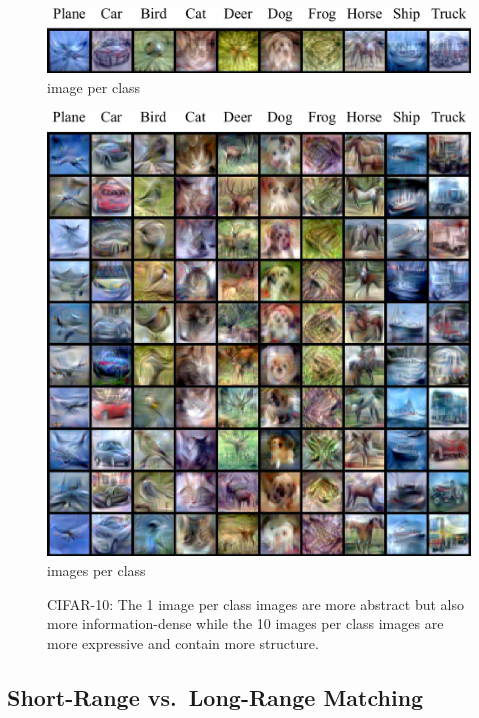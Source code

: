 \documentclass[main.tex]{subfiles}
\begin{document}
\begin{figure}
    \centering
    \vspace{-6pt}
    \includegraphics[width=0.88\linewidth]{figures/CIFAR10_1_ipc.pdf}\\[-0.6ex]
    { image per class} \vspace{0.5cm}\\
        \vspace{-0.34cm}

    \includegraphics[width=0.88\linewidth, trim=0 0 0 20, clip]{figures/CIFAR10.pdf}\\[-0.6ex]
    { images per class}
         \vspace{-7pt}
    \caption{CIFAR-10: The 1 image per class images are more abstract but also more information-dense while the 10 images per class images are more expressive and contain more structure.}
         \vspace{-7pt}
\end{figure}


\subsection{Short-Range vs.~Long-Range Matching}
\end{document}
